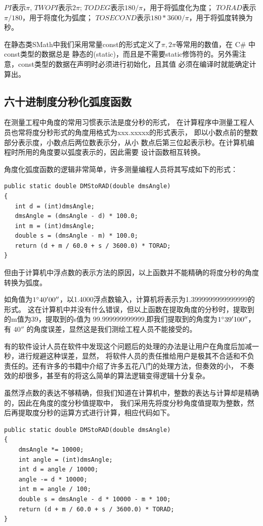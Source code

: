 $PI$表示$\pi$, $TWOPI$表示$2\pi$;
$TODEG$表示$180/\pi$，用于将弧度化为度；
$TORAD$表示$\pi/180$，用于将度化为弧度；
$TOSECOND$表示$180*3600/\pi$，用于将弧度转换为秒。

在静态类SMath中我们采用常量const的形式定义了$\pi, 2\pi$等常用的数值，在 C\# 中 const类型的数据总是
静态的(static)，而且是不需要static修饰符的。另外需注意，const类型的数据在声明时必须进行初始化，且其值
必须在编译时就能确定计算出。

\subsection{六十进制度分秒化弧度函数}

 在测量工程中角度的常用习惯表示法是度分秒的形式，
 在计算程序中测量工程人员也常将度分秒形式的角度用格式为xxx.xxxxx的形式表示，
 即以小数点前的整数部分表示度，小数点后两位数表示分，从小
 数点后第三位起表示秒。在计算机编程时所用的角度要以弧度表示的，因此需要
 设计函数相互转换。

 
角度化弧度函数的逻辑非常简单，许多测量编程人员将其写成如下的形式：

\begin{lstlisting}
public static double DMStoRAD(double dmsAngle)
{
   int d = (int)dmsAngle;
   dmsAngle = (dmsAngle - d) * 100.0;
   int m = (int)dmsAngle;
   double s = (dmsAngle - m) * 100.0;
   return (d + m / 60.0 + s / 3600.0) * TORAD;
}
\end{lstlisting}

但由于计算机中浮点数的表示方法的原因，以上函数并不能精确的将度分秒的角度转换为弧度。

 如角值为$1^\circ 40'00''$，以1.4000浮点数输入，计算机将表示为1.3999999999999999的形式。
 这在计算机中并没有什么错误，但以上函数在提取角度的分秒时，提取到的m值为39，提取到的s值为
 99.999999999999,即我们提取到的角度为$1^\circ 39'100''$，有 $40''$ 的角度误差，显然这是我们测绘工程人员不能接受的。
 
 有的软件设计人员在软件中发现这个问题后的处理的办法是让用户在角度后加减一秒，进行规避这种误差，显然，
 将软件人员的责任推给用户是极其不合适和不负责任的。还有许多的书籍中介绍了许多五花八门的处理方法，但奏效的小，
 不奏效的却很多，甚至有的将这么简单的算法逻辑变得逻辑十分复杂。
 
 虽然浮点数的表达不够精确，但我们知道在计算机中，整数的表达与计算却是精确的，因此在角度的度分秒值提取中，
 我们采用先将度分秒角度值提取为整数，然后再提取度分秒的运算方式进行计算，相应代码如下。
 
\begin{lstlisting}
public static double DMStoRAD(double dmsAngle)
{
    dmsAngle *= 10000; 
    int angle = (int)dmsAngle;
    int d = angle / 10000;
    angle -= d * 10000;
    int m = angle / 100;
    double s = dmsAngle - d * 10000 - m * 100;
    return (d + m / 60.0 + s / 3600.0) * TORAD;
}
\end{lstlisting}

